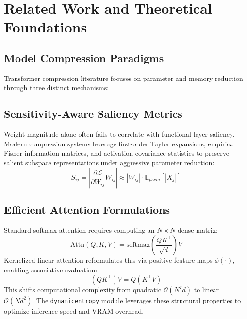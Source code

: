 \section{Related Work and Theoretical Foundations}

\subsection{Model Compression Paradigms}
Transformer compression literature focuses on parameter and memory reduction through three distinct mechanisms:

\subsection{Sensitivity-Aware Saliency Metrics}
Weight magnitude alone often fails to correlate with functional layer saliency. Modern compression systems leverage first-order Taylor expansions, empirical Fisher information matrices, and activation covariance statistics to preserve salient subspace representations under aggressive parameter reduction:
\[
S_{ij} = \left| \frac{\partial \mathcal{L}}{\partial W_{ij}} W_{ij} \right| \approx |W_{ij}| \cdot \mathbb{E}_{p{5cm}}[|X_j|]
\]

\subsection{Efficient Attention Formulations}
Standard softmax attention requires computing an $N \times N$ dense matrix:
\[
\text{Attn}(Q, K, V) = \text{softmax}\left(\frac{Q K^\top}{\sqrt{d}}\right) V
\]
Kernelized linear attention reformulates this via positive feature maps $\phi(\cdot)$, enabling associative evaluation:
\[
(Q K^\top) V = Q (K^\top V)
\]
This shifts computational complexity from quadratic $(N^2 d)$ to linear $(N d^2)$. The \texttt{dynamicentropy} module leverages these structural properties to optimize inference speed and VRAM overhead.
